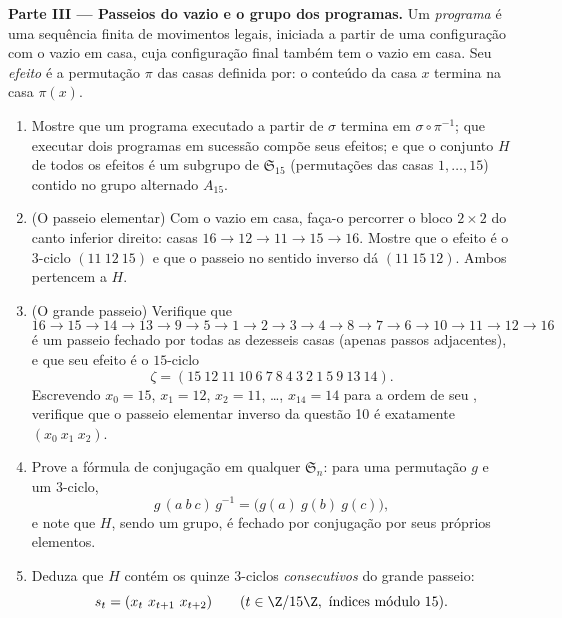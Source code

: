 \begin{problem}
\medskip
\noindent\textbf{Parte III --- Passeios do vazio e o grupo dos
programas.} Um \emph{programa} é uma sequência finita de movimentos
legais, iniciada a partir de uma configuração com o vazio em casa, cuja
configuração final também tem o vazio em casa. Seu \emph{efeito} é a
permutação $\pi$ das casas definida por: o conteúdo da casa $x$
termina na casa $\pi(x)$.
\begin{enumerate}[resume]
  \item Mostre que um programa executado a partir de $\sigma$ termina em $\sigma
        \circ \pi^{-1}$; que executar dois programas em sucessão
        compõe seus efeitos; e que o conjunto $H$ de todos os
        efeitos é um subgrupo de $\mathfrak{S}_{15}$ (permutações
        das casas $1, \dots, 15$) contido no grupo
        alternado $A_{15}$.
  \item (O passeio elementar) Com o vazio em casa, faça-o percorrer o
        bloco $2 \times 2$ do canto inferior direito: casas
        $16 \to 12 \to 11 \to 15 \to 16$. Mostre que o efeito é o
        $3$-ciclo $(11\ 12\ 15)$ e que o passeio no sentido inverso dá
        $(11\ 15\ 12)$. Ambos pertencem a $H$.
  \item (O grande passeio) Verifique que
        \[
        16 \to 15 \to 14 \to 13 \to 9 \to 5 \to 1 \to 2 \to 3
        \to 4 \to 8 \to 7 \to 6 \to 10 \to 11 \to 12 \to 16
        \]
        é um passeio fechado por todas as dezesseis casas (apenas
        passos adjacentes), e que seu efeito é o $15$-ciclo
        \[
        \zeta = (15\ 12\ 11\ 10\ 6\ 7\ 8\ 4\ 3\ 2\ 1\ 5\ 9\ 13\
        14) .
        \]
        Escrevendo $x_0 = 15$, $x_1 = 12$, $x_2 = 11$, \dots, $x_{14}
        = 14$ para a ordem de seu \omterm{def:b2:structures:sn}{ciclo}, verifique que o passeio
        elementar inverso da questão 10 é exatamente $(x_0\ x_1\
        x_2)$.
  \item Prove a fórmula de conjugação em qualquer $\mathfrak{S}_n$: para
        uma permutação $g$ e um $3$-ciclo,
        \[
        g\,(a\ b\ c)\,g^{-1} = \bigl(g(a)\ g(b)\ g(c)\bigr),
        \]
        e note que $H$, sendo um grupo, é fechado por
        conjugação por seus próprios elementos.
  \item Deduza que $H$ contém os quinze $3$-ciclos
        \emph{consecutivos} do grande passeio:
        \[
        s_t = (x_t\ x_{t+1}\ x_{t+2}) \qquad (t \in \Z/15\Z,
        \text{ índices módulo } 15).
        \]
\end{enumerate}


\end{problem}
